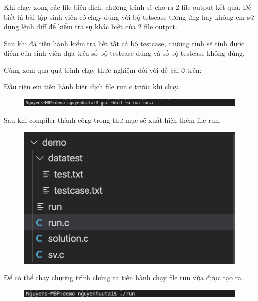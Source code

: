 \documentclass[12pt,a4paper]{report}
\begin{document}
Khi chạy xong các file biên dịch, chương trình sẽ cho ra 2 file output kết quả. Để biết là bài tập sinh viên có chạy đúng với bộ tetscase tương ứng hay không em sử dụng lệnh diff để kiểm tra sự khác biệt của 2 file output.

Sau khi đã tiến hành kiểm tra hết tất cả bộ testcase, chương tình sẽ tính  được điểm của sinh viên dựa trên số bộ testcase đúng và số bộ testcase không đúng.

Cùng xem qua quá trình chạy thực nghiệm đối với đề bài ở trên:

Đầu tiên em tiến hành biên dịch file run.c trước khi chạy.

\begin{figure}[ht]
\begin{center}
\includegraphics[scale=.4]{hinhanh/compilerdemo.png}
\end{center}
\end{figure} \newpage

Sau khi compiler thành công trong thư mục sẽ xuất hiện thêm file run.

\begin{figure}[ht]
\begin{center}
\includegraphics[scale=.4]{hinhanh/cautrucsaucompiler.png}
\end{center}
\end{figure}

Để có thể chạy chương trình chúng ta tiến hành chạy file run vừa được tạo ra.

\begin{figure}[ht]
\begin{center}
\includegraphics[scale=.4]{hinhanh/rundemo.png}
\end{center}
\end{figure}
\end{document}
